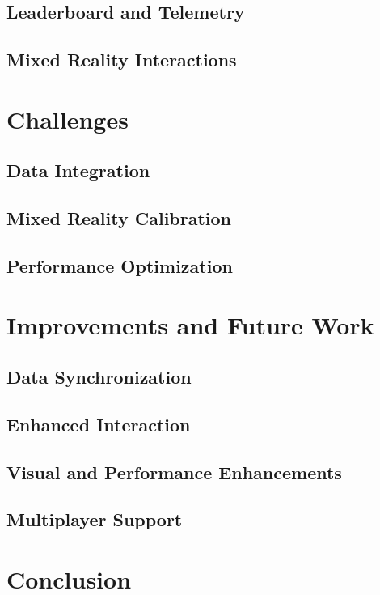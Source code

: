 \documentclass[
	a4paper, %
	10pt, %
	unnumberedsections, %
	twoside, %
]{LTJournalArticle}
\begin{document}
\subsection{Leaderboard and Telemetry}


\subsection{Mixed Reality Interactions}


\section{Challenges}
\subsection{Data Integration}

\subsection{Mixed Reality Calibration}

\subsection{Performance Optimization}

\section{Improvements and Future Work}
\subsection{Data Synchronization}

\subsection{Enhanced Interaction}

\subsection{Visual and Performance Enhancements}

\subsection{Multiplayer Support}

\section{Conclusion}

\printbibliography
\end{document}
